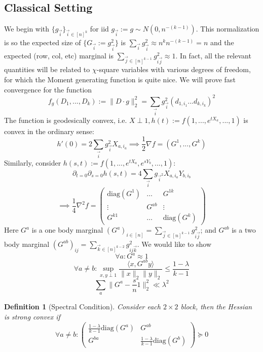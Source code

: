 \documentclass{article}
\newtheorem{definition}{Definition}
\begin{document}
\subsection{Classical Setting}
We begin with $\{g_{\vec{i}}\}_{\vec{i} \in [n]^{k}}$ 
for iid $g_{\vec{i}} := g \sim N(0,n^{-(k-1)})$. 
This normalization is so the expected size of $\{G_{\vec{i}} := g_{\vec{i}}^{2}\}$ is $\sum_{\vec{i}} g_{\vec{i}}^{2} \approx n^{k} n^{-(k-1)} = n$ and the expected (row, col, etc) marginal is $\sum_{\vec{j} \in [n]^{k-1}} g_{i \vec{j}}^{2} \approx 1$. In fact, all the relevant quantities will be related to $\chi$-square variables with various degrees of freedom, for which the Moment generating function is quite nice. We will prove fast convergence for the function
\[ f_{g}(D_{1}, ..., D_{k}) := \|D \cdot g\|_{2}^{2} = \sum_{\vec{i}} g_{\vec{i}}^{2} (d_{1,i_{1}} ... d_{k, i_{k}})^{2}   \]
The function is geodesically convex, i.e. $X \perp 1, h(t) := f(1,..., e^{t X_{a}}, ..., 1)$ is convex in the ordinary sense:
\[ h'(0) = 2 \sum_{\vec{i}} g_{\vec{i}}^{2} X_{a,i_{a}} \implies \frac{1}{2} \nabla f = (G^{1}, ..., G^{k})  \]
Similarly, consider $h(s,t) := f(1, ..., e^{t X_{a}}, e^{s Y_{b}}, ..., 1)$:
\[ \partial_{t=0} \partial_{s=0} h(s,t) = 4 \sum_{\vec{i}} g_{\vec{i}^{2}} X_{a,i_{a}} Y_{b,i_{b}} \]
\[  \implies \frac{1}{4} \nabla^{2} f = \begin{pmatrix} 
             \text{diag}(G^{1}) &  \ldots  & G^{1k}
        \\   \vdots             &  G^{ab}  & \vdots
        \\   G^{k1} &  \ldots  &  \text{diag}(G^{k})
\end{pmatrix}
\]
Here $G^{a}$ is a one body marginal $(G^{a})_{i \in [n]} = \sum_{\vec{j} \in [n]^{k-1}} g_{i\vec{j}}^{2}$; and $G^{ab}$ is a two body marginal $(G^{ab})_{ij} = \sum_{\vec{k} \in [n]^{k-2}} g_{ij\vec{k}}^{2}$. We would like to show 
\[ \forall a: G^{a} \approx 1 \]
\[ \forall a \neq b: \sup_{x,y \perp 1} \dfrac{\langle x, G^{ab} y \rangle}{\|x\|_{2} \|y\|_{2}} \leq \frac{1 - \lambda}{k-1} \]
\[ \sum_{a} \|G^{a} - \frac{s}{n} 1\|_{2}^{2} \ll \lambda^{2}  \]

\begin{definition} [Spectral Condition]
Consider each $2 \times 2$ block, then the Hessian is strong convex if
\[ \forall a \neq b: \begin{pmatrix} \frac{1-\lambda}{k-1} \text{diag}(G^{a}) & G^{ab}
\\ G^{ba} & \frac{1-\lambda}{k-1} \text{diag}(G^{b})
\end{pmatrix}  \succeq 0  \]
\end{definition}
\end{document}
